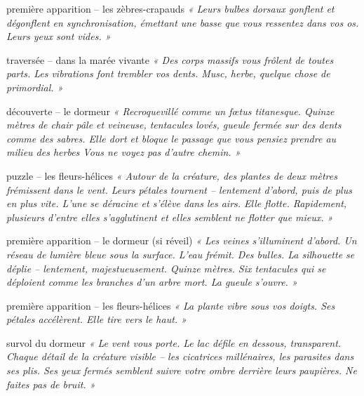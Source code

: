 \documentclass[10pt, a4paper]{article}
\begin{document}
\begin{creaturebox}{première apparition -- les zèbres-crapauds}
\textit{« Leurs bulbes dorsaux gonflent et dégonflent en synchronisation, émettant une basse que vous ressentez dans vos os. Leurs yeux sont vides. »}
\end{creaturebox}

\begin{momentbox}{traversée -- dans la marée vivante}
\textit{« Des corps massifs vous frôlent de toutes parts. Les vibrations font trembler vos dents. Musc, herbe, quelque chose de primordial. »}
\end{momentbox}

\begin{obstaclebox}{découverte -- le dormeur}
\textit{« Recroquevillé comme un fœtus titanesque. Quinze mètres de chair pâle et veineuse, tentacules lovés, gueule fermée sur des dents comme des sabres. Elle dort et bloque le passage que vous pensiez prendre au milieu des herbes Vous ne voyez pas d'autre chemin. »}
\end{obstaclebox}

\begin{puzzlebox}{puzzle -- les fleurs-hélices}
\textit{« Autour de la créature, des plantes de deux mètres frémissent dans le vent. Leurs pétales tournent -- lentement d'abord, puis de plus en plus vite. L'une se déracine et s'élève dans les airs. Elle flotte. Rapidement, plusieurs d'entre elles s'agglutinent et elles semblent ne flotter que mieux. »}
\end{puzzlebox}

\begin{creaturebox}{première apparition -- le dormeur (si réveil)}
\textit{« Les veines s'illuminent d'abord. Un réseau de lumière bleue sous la surface. L'eau frémit. Des bulles. La silhouette se déplie -- lentement, majestueusement. Quinze mètres. Six tentacules qui se déploient comme les branches d'un arbre mort. La gueule s'ouvre. »}
\end{creaturebox}

\begin{creaturebox}{première apparition -- les fleurs-hélices}
\textit{« La plante vibre sous vos doigts. Ses pétales accélèrent. Elle tire vers le haut. »}
\end{creaturebox}

\begin{momentbox}{survol du dormeur}
\textit{« Le vent vous porte. Le lac défile en dessous, transparent. Chaque détail de la créature visible -- les cicatrices millénaires, les parasites dans ses plis. Ses yeux fermés semblent suivre votre ombre derrière leurs paupières. Ne faites pas de bruit. »}
\end{momentbox}
\end{document}
